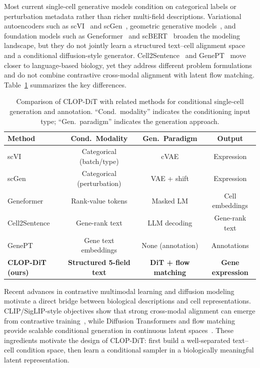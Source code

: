 \documentclass[preprint,12pt]{elsarticle}
\begin{document}
Most current single-cell generative models condition on categorical labels or perturbation metadata rather than richer multi-field descriptions. Variational autoencoders such as scVI~\cite{ref-scvi,ref-scvi-tools} and scGen~\cite{ref-scgen}, geometric generative models~\cite{ref-scdiff}, and foundation models such as Geneformer~\cite{ref-geneformer} and scBERT~\cite{ref-scbert,ref-scfoundation,ref-cellplm,ref-uce} broaden the modeling landscape, but they do not jointly learn a structured text--cell alignment space and a conditional diffusion-style generator. Cell2Sentence~\cite{ref-cell2sentence} and GenePT~\cite{ref-genept} move closer to language-based biology, yet they address different problem formulations and do not combine contrastive cross-modal alignment with latent flow matching. Table~\ref{tab:method-comparison} summarizes the key differences.

\begin{table}[!htbp]
\caption{Comparison of CLOP-DiT with related methods for conditional single-cell generation and annotation. ``Cond.\ modality'' indicates the conditioning input type; ``Gen.\ paradigm'' indicates the generation approach.\label{tab:method-comparison}}
\centering
\small
\begin{tabular}{lccc}
\toprule
\textbf{Method} & \textbf{Cond.\ Modality} & \textbf{Gen.\ Paradigm} & \textbf{Output} \\
\midrule
scVI~\cite{ref-scvi}           & Categorical (batch/type) & cVAE               & Expression \\
scGen~\cite{ref-scgen}         & Categorical (perturbation) & VAE + shift       & Expression \\
Geneformer~\cite{ref-geneformer} & Rank-value tokens & Masked LM           & Cell embeddings \\
Cell2Sentence~\cite{ref-cell2sentence} & Gene-rank text   & LLM decoding        & Gene-rank text \\
GenePT~\cite{ref-genept}       & Gene text embeddings     & None (annotation)   & Annotations \\
\textbf{CLOP-DiT (ours)}       & \textbf{Structured 5-field text} & \textbf{DiT + flow matching} & \textbf{Gene expression} \\
\bottomrule
\end{tabular}
\end{table}

Recent advances in contrastive multimodal learning and diffusion modeling motivate a direct bridge between biological descriptions and cell representations. CLIP/SigLIP-style objectives show that strong cross-modal alignment can emerge from contrastive training~\cite{ref-clip,ref-siglip}, while Diffusion Transformers and flow matching provide scalable conditional generation in continuous latent spaces~\cite{ref-dit,ref-flow-matching,ref-albergo-flow,ref-rectified-flow}. These ingredients motivate the design of CLOP-DiT: first build a well-separated text--cell condition space, then learn a conditional sampler in a biologically meaningful latent representation.
\end{document}
